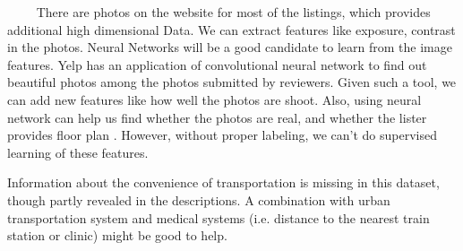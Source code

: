 \documentclass{article}
\begin{document}
~~~~ There are photos on the website for most of the listings, which provides additional high dimensional Data. We can extract features like exposure, contrast in the photos. Neural Networks will be a good candidate to learn from the image features. Yelp has an application of convolutional neural network to find out beautiful photos among the photos submitted by reviewers. Given such a tool, we can add new features like how well the photos are shoot. Also, using neural network can help us find whether the photos are real, and whether the lister provides floor plan \cite{yelp}. However, without proper labeling, we can't do supervised learning of these features. %

Information about the convenience of transportation is missing in this dataset, though partly revealed in the descriptions. A combination with urban transportation system and medical systems (i.e. distance to the nearest train station or clinic) might be good to help.
\end{document}

